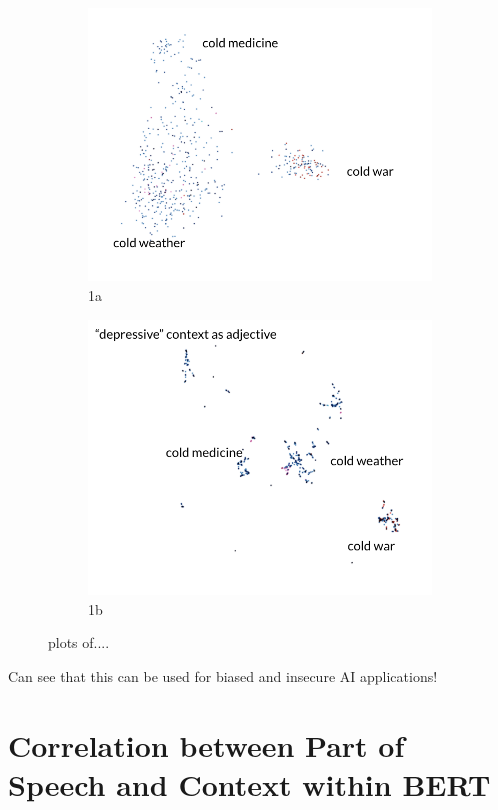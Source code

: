 \documentclass[a4paper,12pt,twoside,openright]{report}
\begin{document}
\begin{figure}
\begin{subfigure}{.5\textwidth}
  \centering
  \includegraphics[width=.8\linewidth]{./assets/analysis/cold_pca.png}
  \caption{1a}
  \label{fig:sfig1}
\end{subfigure}%
\begin{subfigure}{.5\textwidth}
  \centering
  \includegraphics[width=.8\linewidth]{./assets/analysis/cold_umap.png}
  \caption{1b}
  \label{fig:sfig2}
\end{subfigure}
\caption{plots of....}
\label{fig:fig}
\end{figure}


Can see that this can be used for biased and insecure AI applications!

\section{Correlation between Part of Speech and Context within BERT}
\end{document}
